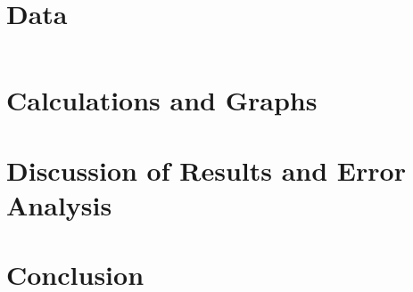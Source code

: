 \documentclass[12pt,letterpaper,titlepage]{report}
\begin{document}

\section*{Data}

\begin{tabular}{c || c | c }

\end{tabular}


\section*{Calculations and Graphs}


\section*{Discussion of Results and Error Analysis}


\section*{Conclusion}
\end{document}
